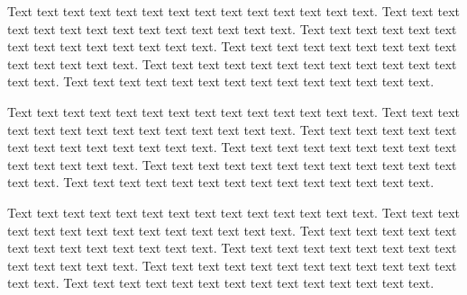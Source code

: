 \documentclass[letterpaper,11pt,oneside]{article}
\begin{document}
Text text text text text text text text text text text text text text.
Text text text text text text text text text text text text text text.
Text text text text text text text text text text text text text text.
Text text text text text text text text text text text text text text.
Text text text text text text text text text text text text text text.
Text text text text text text text text text text text text text text.

Text text text text text text text text text text text text text text.
Text text text text text text text text text text text text text text.
Text text text text text text text text text text text text text text.
Text text text text text text text text text text text text text text.
Text text text text text text text text text text text text text text.
Text text text text text text text text text text text text text text.

Text text text text text text text text text text text text text text.
Text text text text text text text text text text text text text text.
Text text text text text text text text text text text text text text.
Text text text text text text text text text text text text text text.
Text text text text text text text text text text text text text text.
Text text text text text text text text text text text text text text.
\end{document}
